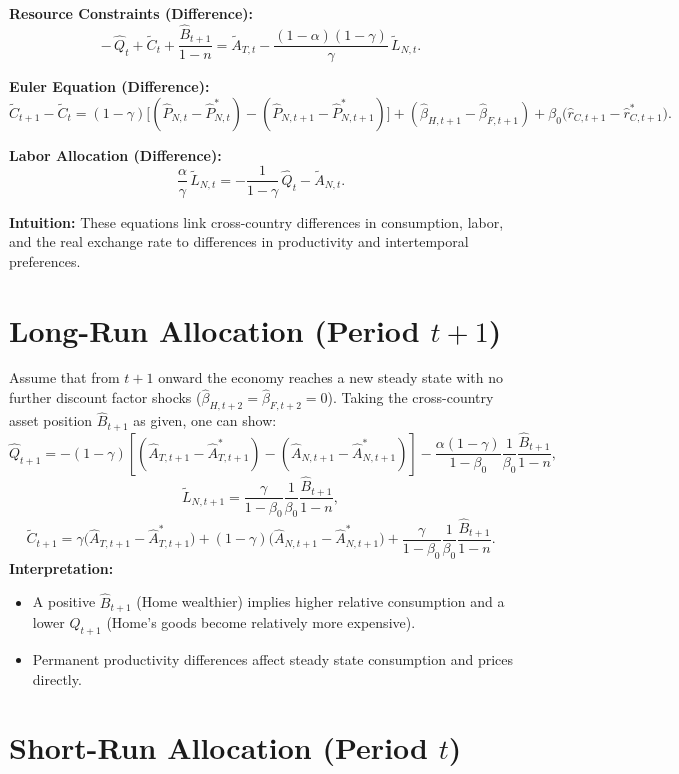 \documentclass[a4paper,12pt]{article} %
\theoremstyle{nonitalic}
\begin{document}
\textbf{Resource Constraints (Difference):}
\[
-\,\hat{Q}_t + \tilde{C}_t + \frac{\hat{B}_{t+1}}{1-n} = \tilde{A}_{T,t} - \frac{(1-\alpha)(1-\gamma)}{\gamma}\,\tilde{L}_{N,t}. \tag{9b}
\]

\textbf{Euler Equation (Difference):}
\[
\tilde{C}_{t+1}-\tilde{C}_t = (1-\gamma)\Big[(\hat{P}_{N,t}-\hat{P}^*_{N,t}) - (\hat{P}_{N,t+1}-\hat{P}^*_{N,t+1})\Big] + (\hat{\beta}_{H,t+1}-\hat{\beta}_{F,t+1}) + \beta_0\Big(\hat{r}_{C,t+1}-\hat{r}^*_{C,t+1}\Big). \tag{9c}
\]

\textbf{Labor Allocation (Difference):}
\[
\frac{\alpha}{\gamma}\,\tilde{L}_{N,t} = -\frac{1}{1-\gamma}\,\hat{Q}_t - \tilde{A}_{N,t}. \tag{9d}
\]

\textbf{Intuition:} These equations link cross-country differences in consumption, labor, and the real exchange rate to differences in productivity and intertemporal preferences.

\section{Long-Run Allocation (Period \(t+1\))}

Assume that from \( t+1 \) onward the economy reaches a new steady state with no further discount factor shocks (\( \hat{\beta}_{H,t+2} = \hat{\beta}_{F,t+2} = 0 \)). Taking the cross-country asset position \( \hat{B}_{t+1} \) as given, one can show:
\[
\hat{Q}_{t+1} = - (1-\gamma)\left[(\hat{A}_{T,t+1}-\hat{A}^*_{T,t+1}) - (\hat{A}_{N,t+1}-\hat{A}^*_{N,t+1})\right] - \frac{\alpha(1-\gamma)}{1-\beta_0}\frac{1}{\beta_0}\frac{\hat{B}_{t+1}}{1-n},
\]
\[
\tilde{L}_{N,t+1} = \frac{\gamma}{1-\beta_0}\frac{1}{\beta_0}\frac{\hat{B}_{t+1}}{1-n},
\]
\[
\tilde{C}_{t+1} = \gamma\big(\hat{A}_{T,t+1}-\hat{A}^*_{T,t+1}\big) + (1-\gamma)\big(\hat{A}_{N,t+1}-\hat{A}^*_{N,t+1}\big) + \frac{\gamma}{1-\beta_0}\frac{1}{\beta_0}\frac{\hat{B}_{t+1}}{1-n}.
\]
\textbf{Interpretation:}
\begin{itemize}
    \item A positive \( \hat{B}_{t+1} \) (Home wealthier) implies higher relative consumption and a lower \( Q_{t+1} \) (Home’s goods become relatively more expensive).
    \item Permanent productivity differences affect steady state consumption and prices directly.
\end{itemize}

\section{Short-Run Allocation (Period \(t\))}
\end{document}
